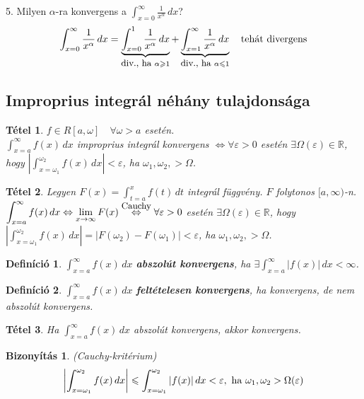 \documentclass[a4paper,12pt,twoside]{book}
\newtheorem{tetel}{Tétel}[chapter]
\newtheorem{defi}{Definíció}[chapter]
\theoremstyle{break}
\theoremstyle{plain}
\newtheorem{bizNoNL}[biz]{Bizonyítás}
\newcommand{\hatInteg}[3]{\ensuremath{\int^{#2}_{x=#1} #3\, dx}}
\newcommand{\intfv}[3]{\ensuremath{\int^{#2}_{t=#1} #3\, dt}}
\begin{document}
5. Milyen $\alpha$-ra konvergens a $\displaystyle \hatInteg{0}{\infty}{\frac{1}{x^{\alpha}}}$?\\
\[\hatInteg{0}{\infty}{\frac{1}{x^{\alpha}}} = \underbrace{\hatInteg{0}{1}{\frac{1}{x^{\alpha}}}}_{\hbox{\small div., ha }\alpha \geqslant 1} + \underbrace{\hatInteg{1}{\infty}{\frac{1}{x^{\alpha}}}}_{\hbox{\small div., ha }\alpha \leqslant 1} \quad \hbox{tehát divergens}\]

\subsection{Improprius integrál néhány tulajdonsága}

\begin{tetel}
 $f\in R[a, \omega] \quad \forall\omega > a$ esetén.\\
 $\displaystyle \hatInteg{a}{\infty}{f(x)}$ improprius integrál konvergens $\Leftrightarrow \forall\varepsilon>0$ esetén $\exists \Omega(\varepsilon)\in\mathbb{R}$, hogy $\displaystyle\left|\hatInteg{\omega_1}{\omega_2}{f(x)}\right|<\varepsilon$, ha $\omega_1, \omega_2, > \Omega$.
\end{tetel}
\addtocounter{biz}{1}

\begin{tetel}
 Legyen $F(x) = \intfv{a}{x}{f(t)}$ integrál függvény. $F$ folytonos $[a,\infty)$-n.\\
 $\displaystyle \hatInteg{a}{\infty}{f(x)} \Leftrightarrow \lim_{x\to\infty} F(x) \overset{\hbox{\small Cauchy}}{\Leftrightarrow} \forall\varepsilon>0$ esetén $\exists \Omega(\varepsilon)\in\mathbb{R}$, hogy $\displaystyle\left|\hatInteg{\omega_1}{\omega_2}{f(x)}\right|=|F(\omega_2)-F(\omega_1)|<\varepsilon$, ha $\omega_1, \omega_2, > \Omega$.
\end{tetel}
\addtocounter{biz}{1}

\begin{defi}
 $\displaystyle \hatInteg{a}{\infty}{f(x)}$ \textbf{abszolút konvergens}, ha $\exists \hatInteg{a}{\infty}{|f(x)|} < \infty$.
\end{defi}
\begin{defi}
 $\displaystyle \hatInteg{a}{\infty}{f(x)}$ \textbf{feltételesen konvergens}, ha konvergens, de nem abszolút konvergens.
\end{defi}

\begin{tetel}
 Ha $\displaystyle \hatInteg{a}{\infty}{f(x)}$ abszolút konvergens, akkor konvergens.
\end{tetel}
\begin{bizNoNL} (Cauchy-kritérium)\\
\[\left|\hatInteg{\omega_1}{\omega_2}{f(x)}\right|\leqslant \hatInteg{\omega_1}{\omega_2}{|f(x)|} <\varepsilon, \hbox{ ha } \omega_1,\omega_2 > \Omega(\varepsilon) \]
\end{bizNoNL}
\end{document}

